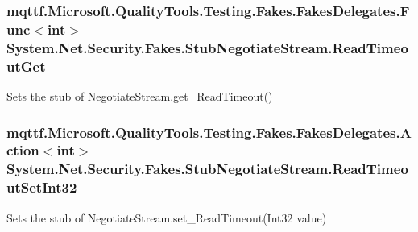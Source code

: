 \hypertarget{class_system_1_1_net_1_1_security_1_1_fakes_1_1_stub_negotiate_stream_a3de019eb176c42ca9141103d2d923e6b}{
\subsubsection[{Read\-Timeout\-Get}]{\setlength{\rightskip}{0pt plus 5cm}mqttf.\-Microsoft.\-Quality\-Tools.\-Testing.\-Fakes.\-Fakes\-Delegates.\-Func$<$int$>$ System.\-Net.\-Security.\-Fakes.\-Stub\-Negotiate\-Stream.\-Read\-Timeout\-Get}}\label{class_system_1_1_net_1_1_security_1_1_fakes_1_1_stub_negotiate_stream_a3de019eb176c42ca9141103d2d923e6b}


Sets the stub of Negotiate\-Stream.\-get\-\_\-\-Read\-Timeout()

\hypertarget{class_system_1_1_net_1_1_security_1_1_fakes_1_1_stub_negotiate_stream_af8090ba02b7c4a3ee413df1c575bb6df}{
\subsubsection[{Read\-Timeout\-Set\-Int32}]{\setlength{\rightskip}{0pt plus 5cm}mqttf.\-Microsoft.\-Quality\-Tools.\-Testing.\-Fakes.\-Fakes\-Delegates.\-Action$<$int$>$ System.\-Net.\-Security.\-Fakes.\-Stub\-Negotiate\-Stream.\-Read\-Timeout\-Set\-Int32}}\label{class_system_1_1_net_1_1_security_1_1_fakes_1_1_stub_negotiate_stream_af8090ba02b7c4a3ee413df1c575bb6df}


Sets the stub of Negotiate\-Stream.\-set\-\_\-\-Read\-Timeout(\-Int32 value)

